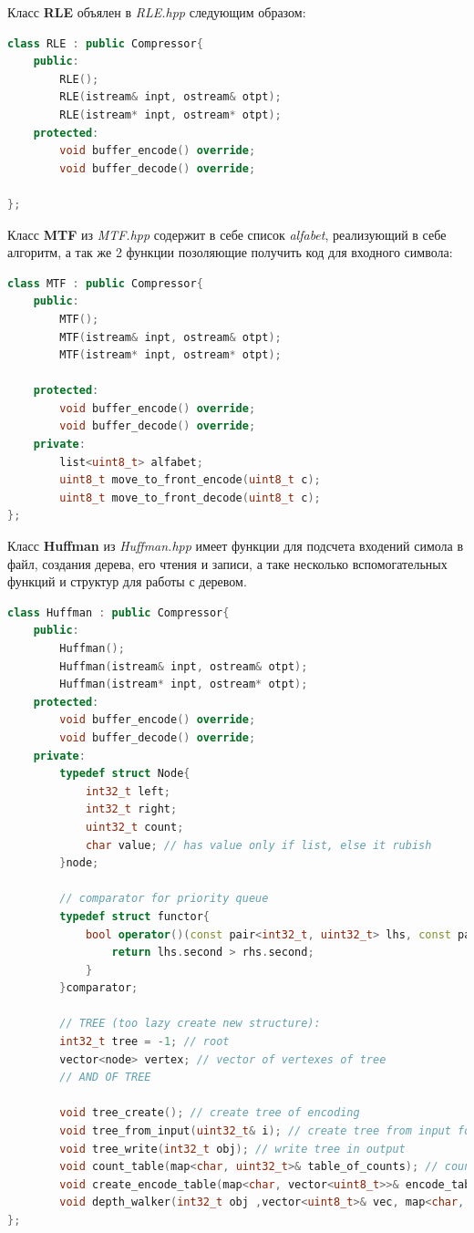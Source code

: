 Класс {\bfseries RLE} объялен в {\it RLE.hpp} следующим образом:

\begin{lstlisting}[language=C++]
class RLE : public Compressor{
    public:
        RLE();
        RLE(istream& inpt, ostream& otpt);
        RLE(istream* inpt, ostream* otpt);
    protected:
        void buffer_encode() override;
        void buffer_decode() override;

};
\end{lstlisting}

Класс {\bfseries MTF} из {\it MTF.hpp} содержит в себе список {\it alfabet}, реализующий в себе алгоритм, а так же 2 функции позоляющие получить код для входного символа:

\begin{lstlisting}[language=C++]
class MTF : public Compressor{
    public:
        MTF();
        MTF(istream& inpt, ostream& otpt);
        MTF(istream* inpt, ostream* otpt);
        
    protected:
        void buffer_encode() override;
        void buffer_decode() override;
    private:
        list<uint8_t> alfabet;
        uint8_t move_to_front_encode(uint8_t c);
        uint8_t move_to_front_decode(uint8_t c);
};
\end{lstlisting}

Класс {\bfseries Huffman} из {\it Huffman.hpp} имеет функции для подсчета входений симола в файл, создания дерева, его чтения и записи, а таке несколько вспомогательных функций и структур для работы с деревом.

\begin{lstlisting}[language=C++]
class Huffman : public Compressor{
    public:
        Huffman();
        Huffman(istream& inpt, ostream& otpt);
        Huffman(istream* inpt, ostream* otpt);
    protected:
        void buffer_encode() override;
        void buffer_decode() override;
    private:
        typedef struct Node{
            int32_t left;
            int32_t right;
            uint32_t count;
            char value; // has value only if list, else it rubish
        }node;
    
        // comparator for priority queue
        typedef struct functor{
            bool operator()(const pair<int32_t, uint32_t> lhs, const pair<int32_t, uint32_t> rhs){
                return lhs.second > rhs.second;
            }
        }comparator;

        // TREE (too lazy create new structure):
        int32_t tree = -1; // root
        vector<node> vertex; // vector of vertexes of tree
        // AND OF TREE
        
        void tree_create(); // create tree of encoding
        void tree_from_input(uint32_t& i); // create tree from input for decoding
        void tree_write(int32_t obj); // write tree in output
        void count_table(map<char, uint32_t>& table_of_counts); // count simbols
        void create_encode_table(map<char, vector<uint8_t>>& encode_table);
        void depth_walker(int32_t obj ,vector<uint8_t>& vec, map<char, vector<uint8_t>>& mp);  
};
\end{lstlisting}


